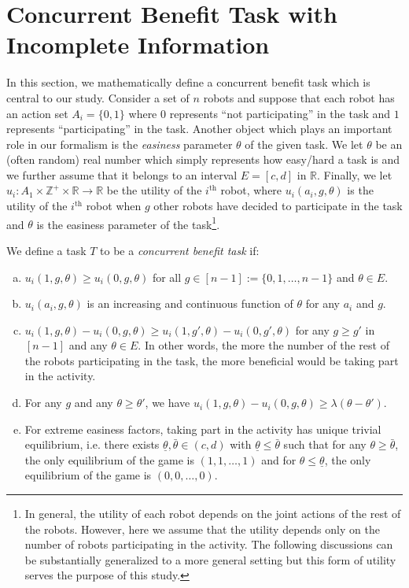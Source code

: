 \documentclass[conference]{ieeeconf}
\def\Z{\mathbb{Z}}
\def\R{\mathbb{R}}
\begin{document}
\section{Concurrent Benefit Task with Incomplete Information}
In this section, we mathematically define a concurrent benefit task which is central to our study. Consider a set of $n$ robots and suppose that each robot has an action set $A_i=\{0,1\}$ where $0$ represents ``not participating'' in the task and $1$ represents ``participating'' in the task.  Another object which plays an important role in our formalism is the \textit{easiness} parameter $\theta$ of the given task. We let $\theta$ be an (often random) real number which simply represents how easy/hard a task is and we further assume that it belongs to an interval $E=[c,d]$ in $\R$.  Finally, we let $u_i:A_1\times\Z^+\times \R\to \R$ be the utility of the $i^{\text{th}}$ robot, where $u_i(a_i,g,\theta)$ is the utility of the $i^{\text{th}}$ robot when $g$ other robots have decided to participate in the task and $\theta$ is the easiness parameter of the task\footnote{In general, the utility of each robot depends on the joint actions of the rest of the robots. However, here we assume that the utility depends only on the number of robots participating in the activity. The following discussions can be substantially generalized to a more general setting but this form of utility serves the purpose of this study.}. 

We define a task $T$ to be a \textit{concurrent benefit task} if: 
\begin{enumerate}[a.]
	\item $u_i(1,g,\theta)\geq u_i(0,g,\theta)$ for all $g\in[n-1]:=\{0,1,\ldots,n-1\}$ and $\theta \in E$. 
	\item $u_i(a_i,g,\theta)$ is an increasing and continuous function of $\theta$ for any $a_i$ and $g$. 
	\item $u_i(1,g,\theta)-u_i(0,g,\theta)\geq u_i(1,g',\theta)-u_i(0,g',\theta)$ for any $g\geq g'$ in $[n-1]$ and any $\theta\in E$. In other words, the more the number of the rest of the robots participating in the task, the more beneficial would be taking part in the activity.
	\item For any $g$ and any $\theta\geq \theta'$, we have $u_i(1,g,\theta)-u_i(0,g,\theta)\geq \lambda (\theta-\theta')$. 
	\item For extreme easiness factors, taking part in the activity has unique trivial equilibrium, i.e. there exists $\underline{\theta},\bar{\theta}\in (c,d)$ with $\underline{\theta}\leq \bar{\theta}$ such that for any $\theta\geq \bar{\theta}$, the only equilibrium of the game is $(1,1,\ldots,1)$ and for $\theta\leq \underline{\theta}$, the only equilibrium of the game is $(0,0,\ldots,0)$.
\end{enumerate}
\end{document}
